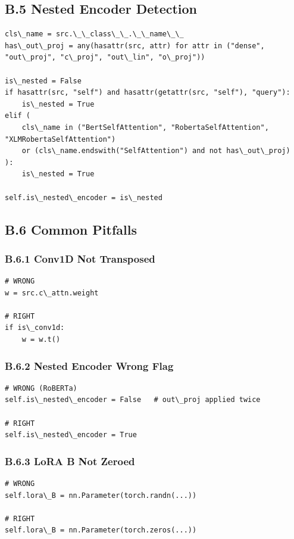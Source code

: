 \subsection{B.5 Nested Encoder Detection}

\begin{lstlisting}
cls\_name = src.\_\_class\_\_.\_\_name\_\_
has\_out\_proj = any(hasattr(src, attr) for attr in ("dense", "out\_proj", "c\_proj", "out\_lin", "o\_proj"))

is\_nested = False
if hasattr(src, "self") and hasattr(getattr(src, "self"), "query"):
    is\_nested = True
elif (
    cls\_name in ("BertSelfAttention", "RobertaSelfAttention", "XLMRobertaSelfAttention")
    or (cls\_name.endswith("SelfAttention") and not has\_out\_proj)
):
    is\_nested = True

self.is\_nested\_encoder = is\_nested
\end{lstlisting}

\subsection{B.6 Common Pitfalls}

\subsubsection{B.6.1 Conv1D Not Transposed}

\begin{lstlisting}
# WRONG
w = src.c\_attn.weight

# RIGHT
if is\_conv1d:
    w = w.t()
\end{lstlisting}

\subsubsection{B.6.2 Nested Encoder Wrong Flag}

\begin{lstlisting}
# WRONG (RoBERTa)
self.is\_nested\_encoder = False   # out\_proj applied twice

# RIGHT
self.is\_nested\_encoder = True
\end{lstlisting}

\subsubsection{B.6.3 LoRA B Not Zeroed}

\begin{lstlisting}
# WRONG
self.lora\_B = nn.Parameter(torch.randn(...))

# RIGHT
self.lora\_B = nn.Parameter(torch.zeros(...))
\end{lstlisting}

